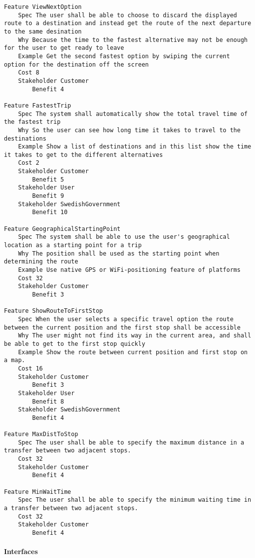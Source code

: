 \begin{lstlisting}
Feature ViewNextOption
	Spec The user shall be able to choose to discard the displayed route to a destination and instead get the route of the next departure to the same desination
	Why Because the time to the fastest alternative may not be enough for the user to get ready to leave
	Example Get the second fastest option by swiping the current option for the destination off the screen
	Cost 8
	Stakeholder Customer
		Benefit 4

Feature FastestTrip
	Spec The system shall automatically show the total travel time of the fastest trip
	Why So the user can see how long time it takes to travel to the destinations
	Example Show a list of destinations and in this list show the time it takes to get to the different alternatives
	Cost 2
	Stakeholder Customer
		Benefit 5
	Stakeholder User
		Benefit 9
	Stakeholder SwedishGovernment
		Benefit 10

Feature GeographicalStartingPoint
	Spec The system shall be able to use the user's geographical location as a starting point for a trip
	Why The position shall be used as the starting point when determining the route
	Example Use native GPS or WiFi-positioning feature of platforms
	Cost 32
	Stakeholder Customer
		Benefit 3

Feature ShowRouteToFirstStop
	Spec When the user selects a specific travel option the route between the current position and the first stop shall be accessible
	Why The user might not find its way in the current area, and shall be able to get to the first stop quickly
	Example Show the route between current position and first stop on a map.
	Cost 16
	Stakeholder Customer
		Benefit 3
	Stakeholder User
		Benefit 8
	Stakeholder SwedishGovernment
		Benefit 4

Feature MaxDistToStop
	Spec The user shall be able to specify the maximum distance in a transfer between two adjacent stops.
	Cost 32
	Stakeholder Customer
		Benefit 4

Feature MinWaitTime
	Spec The user shall be able to specify the minimum waiting time in a transfer between two adjacent stops.
	Cost 32
	Stakeholder Customer
		Benefit 4

\end{lstlisting}
		
				
			 \paragraph{Interfaces}


